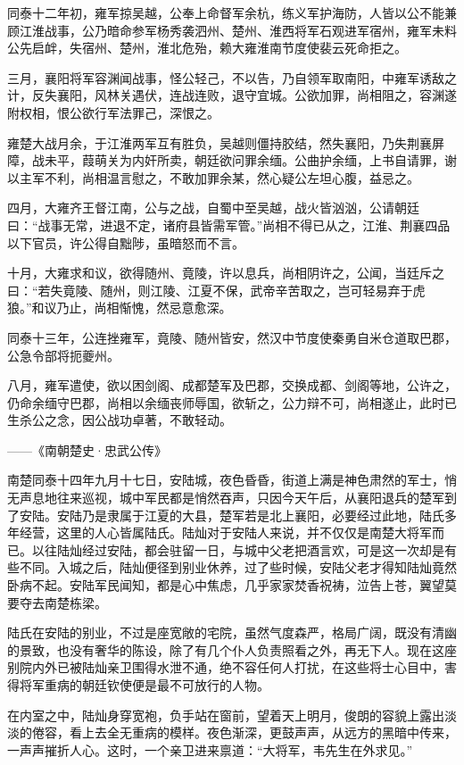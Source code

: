 同泰十二年初，雍军掠吴越，公奉上命督军余杭，练义军护海防，人皆以公不能兼顾江淮战事，公乃暗命参军杨秀袭泗州、楚州、淮西将军石观进军宿州，雍军未料公先启衅，失宿州、楚州，淮北危殆，赖大雍淮南节度使裴云死命拒之。

三月，襄阳将军容渊闻战事，怪公轻己，不以告，乃自领军取南阳，中雍军诱敌之计，反失襄阳，风林关遇伏，连战连败，退守宜城。公欲加罪，尚相阻之，容渊遂附权相，恨公欲行军法罪己，深恨之。

雍楚大战月余，于江淮两军互有胜负，吴越则僵持胶结，然失襄阳，乃失荆襄屏障，战未平，葭萌关为内奸所卖，朝廷欲问罪余缅。公曲护余缅，上书自请罪，谢以主军不利，尚相温言慰之，不敢加罪余某，然心疑公左坦心腹，益忌之。

四月，大雍齐王督江南，公与之战，自蜀中至吴越，战火皆汹汹，公请朝廷曰：“战事无常，进退不定，诸府县皆需军管。”尚相不得已从之，江淮、荆襄四品以下官员，许公得自黜陟，虽暗怒而不言。

十月，大雍求和议，欲得随州、竟陵，许以息兵，尚相阴许之，公闻，当廷斥之曰：“若失竟陵、随州，则江陵、江夏不保，武帝辛苦取之，岂可轻易弃于虎狼。”和议乃止，尚相惭愧，然忌意愈深。

同泰十三年，公连挫雍军，竟陵、随州皆安，然汉中节度使秦勇自米仓道取巴郡，公急令部将扼夔州。

八月，雍军遣使，欲以困剑阁、成都楚军及巴郡，交换成都、剑阁等地，公许之，仍命余缅守巴郡，尚相以余缅丧师辱国，欲斩之，公力辩不可，尚相遂止，此时已生杀公之念，因公战功卓著，不敢轻动。

——《南朝楚史·忠武公传》

南楚同泰十四年九月十七日，安陆城，夜色昏昏，街道上满是神色肃然的军士，悄无声息地往来巡视，城中军民都是悄然吞声，只因今天午后，从襄阳退兵的楚军到了安陆。安陆乃是隶属于江夏的大县，楚军若是北上襄阳，必要经过此地，陆氏多年经营，这里的人心皆属陆氏。陆灿对于安陆人来说，并不仅仅是南楚大将军而已。以往陆灿经过安陆，都会驻留一日，与城中父老把酒言欢，可是这一次却是有些不同。入城之后，陆灿便径到别业休养，过了些时候，安陆父老才得知陆灿竟然卧病不起。安陆军民闻知，都是心中焦虑，几乎家家焚香祝祷，泣告上苍，翼望莫要夺去南楚栋梁。

陆氏在安陆的别业，不过是座宽敞的宅院，虽然气度森严，格局广阔，既没有清幽的景致，也没有奢华的陈设，除了有几个仆人负责照看之外，再无下人。现在这座别院内外已被陆灿亲卫围得水泄不通，绝不容任何人打扰，在这些将士心目中，害得将军重病的朝廷钦使便是最不可放行的人物。

在内室之中，陆灿身穿宽袍，负手站在窗前，望着天上明月，俊朗的容貌上露出淡淡的倦容，看上去全无重病的模样。夜色渐深，更鼓声声，从远方的黑暗中传来，一声声摧折人心。这时，一个亲卫进来禀道：“大将军，韦先生在外求见。”


